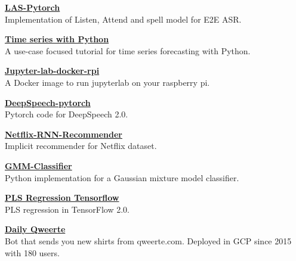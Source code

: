 
\textcolor{SlateGrey}{\textbf{\href{https://github.com/jiwidi/las-pytorch}{LAS-Pytorch }}} \\ 
Implementation of Listen, Attend and spell model for E2E ASR.
\newline
{}


\textcolor{SlateGrey}{\textbf{\href{https://github.com/jiwidi/time-series-forecasting-with-python}{ Time series with Python  }}} \\ 
A use-case focused tutorial for time series forecasting with Python.
\newline
{}


\textcolor{SlateGrey}{\textbf{\href{https://github.com/jiwidi/jupyter-lab-docker-rpi}{ Jupyter-lab-docker-rpi}}} \\ 
A Docker image to run jupyterlab on your raspberry pi. 
\newline
{}


\textcolor{SlateGrey}{\textbf{\href{https://github.com/jiwidi/DeepSpeech-pytorch}{ DeepSpeech-pytorch}}} \\ 
Pytorch code for DeepSpeech 2.0.
\newline
{}



\textcolor{SlateGrey}{\textbf{\href{https://github.com/jiwidi/Netflix-RNN-Recommender}{ Netflix-RNN-Recommender}}} \\ 
Implicit recommender for Netflix dataset.
\newline
{}

\textcolor{SlateGrey}{\textbf{\href{https://github.com/jiwidi/gmm-classifier}{ GMM-Classifier}}} \\ 
Python implementation for a Gaussian mixture model classifier.
\newline
{}

\textcolor{SlateGrey}{\textbf{\href{https://github.com/jiwidi/PLS-regression-tensorflow}{ PLS Regression Tensorflow}}} \\ 
PLS regression in TensorFlow 2.0.
\newline
{}

\textcolor{SlateGrey}{\textbf{\href{https://github.com/jiwidi/DailyQwertee}{ Daily Qweerte}}} \\ 
Bot that sends you new shirts from qweerte.com. Deployed in GCP since 2015 with 180 users.
\newline
{}



